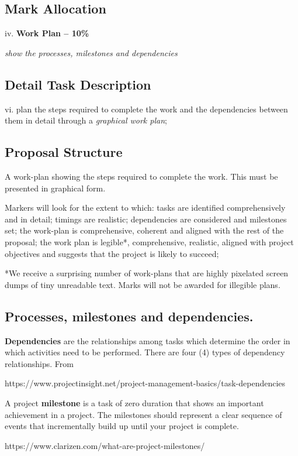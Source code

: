 \subsection{Mark Allocation}

iv. \textbf{Work Plan -- 10\%}

\textit{show the processes, milestones and dependencies}

\subsection{Detail Task Description} 

vi. plan the steps required to complete the work and the dependencies between them in detail through a \textit{graphical work plan};

\subsection{Proposal Structure}

A work-plan showing the steps required to complete the work. This must be presented in graphical form.

Markers will look for the extent to which: tasks are identified comprehensively and in detail; timings are realistic; dependencies are considered and milestones set; the work-plan is comprehensive, coherent and aligned with the rest of the proposal; the work plan is legible*, comprehensive, realistic, aligned with project objectives and suggests that the project is likely to succeed;

*We receive a surprising number of work-plans that are highly pixelated screen dumps of tiny unreadable text. Marks will not be awarded for illegible plans.

\subsection{Processes, milestones and dependencies.}

\textbf{Dependencies} are the relationships among tasks which determine the order in which activities need to be performed. There are four (4) types of dependency relationships. From  

https://www.projectinsight.net/project-management-basics/task-dependencies

A project \textbf{milestone} is a task of zero duration that shows an important achievement in a project. The milestones should represent a clear sequence of events that incrementally build up until your project is complete.

https://www.clarizen.com/what-are-project-milestones/